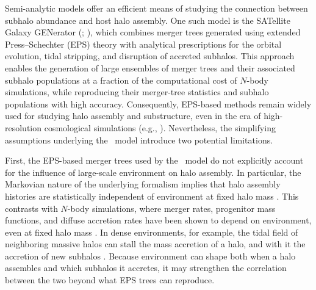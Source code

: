 \documentclass[twocolumn,apj,numberedappendix,twocolappendix,iop]{openjournal}
\begin{document}

Semi-analytic models offer an efficient means of studying the connection between subhalo abundance and host halo assembly. One such model is the SATellite Galaxy GENerator (\SatGen; \citealp{Jiang.etal.21}), which combines merger trees generated using extended Press--Schechter (EPS) theory \citep{Parkinson.etal.08} with analytical prescriptions for the orbital evolution, tidal stripping, and disruption of accreted subhalos. This approach enables the generation of large ensembles of merger trees and their associated subhalo populations at a fraction of the computational cost of $N$-body simulations, while reproducing their merger-tree statistics \citep{Jiang.vdBosch.14, vdBosch.etal.14} and subhalo populations \citep{Jiang.etal.21} with high accuracy. Consequently, EPS-based methods remain widely used for studying halo assembly and substructure, even in the era of high-resolution cosmological simulations (e.g., \citealp{Folsom.etal.2023, Nadler.etal.23b, Danieli.etal.23, Monzon.etal.24, Dropulic.etal.25, Li.etal.26, Monzon.etal.26}). Nevertheless, the simplifying assumptions underlying the \SatGen\ model introduce two potential limitations.

First, the EPS-based merger trees used by the \SatGen\ model do not explicitly account for the influence of large-scale environment on halo assembly. In particular, the Markovian nature of the underlying formalism implies that halo assembly histories are statistically independent of environment at fixed halo mass \citep{Zentner.07, Ma.etal.11, Zhang.etal.14}. This contrasts with $N$-body simulations, where merger rates, progenitor mass functions, and diffuse accretion rates have been shown to depend on environment, even at fixed halo mass \citep{Fakhouri.Ma.09, Fakhouri.Ma.10}. In dense environments, for example, the tidal field of neighboring massive halos can stall the mass accretion of a halo, and with it the accretion of new subhalos \citep{Dalal.etal.08, Hahn.etal.09}. Because environment can shape both when a halo assembles and which subhalos it accretes, it may strengthen the correlation between the two beyond what EPS trees can reproduce. 
\end{document}
